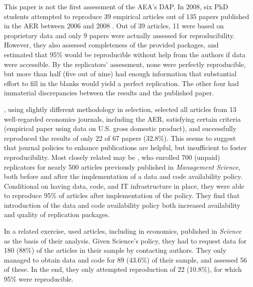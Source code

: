 This paper is not the first assessment of the AEA's DAP. In 2008, six PhD students attempted to reproduce 39 empirical articles out of 135  papers published in the AER between 2006 and 2008 \parencite{Glandon2010}. Out of 39 articles, 11 were based on proprietary data and only 9 papers were actually assessed for reproducibility. However, they also assessed completeness of the provided packages, and estimated that 95\% would be reproducible without help from the authors if data were accessible. By the replicators' assessment, none were perfectly reproducible, but more than half (five out of nine) had enough information that substantial effort to fill in the blanks would yield a perfect replication. The other four had immaterial discrepancies between the results and the published paper. 

\textcite{ChangLi2015}, using slightly different methodology in selection, selected all articles from 13 well-regarded economics journals, including the AER, satisfying certain criteria (empirical paper using data on U.S. gross domestic product), and successfully reproduced the results of only 22 of 67 papers (32.8\%). This seems to suggest that journal policies to enhance publications are helpful, but insufficient to foster reproducibility. Most closely related may be \textcite{greiner2023}, who enrolled 700 (unpaid) replicators for nearly 500 articles previously published in \textit{Management Science}, both before and after the implementation of a data and code availability policy. Conditional on having data, code, and IT infrastructure in place, they were able to reproduce 95\% of articles after implementation of the policy. They find that introduction of the data and code availability policy both increased availability and quality of replication packages. 


In a related exercise, \citet{Stodden2018} used articles, including in economics, published in \textit{Science} as the basis of their analysis. Given Science's policy, they had to request data for 180 (88\%) of the articles in their sample by contacting authors.  They only managed to obtain data and code for 89 (43.6\%) of their sample, and assessed 56 of these. In the end, they only attempted reproduction of 22 (10.8\%), for which 95\% were reproducible. 

